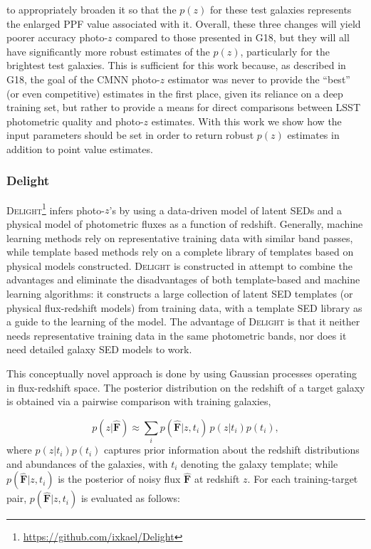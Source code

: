 \documentclass[usenatbib]{mn2e}
\begin{document}
\noindent to appropriately broaden it so that the $p(z)$ for these test galaxies represents the enlarged PPF value associated with it. Overall, these three changes will yield poorer accuracy photo-$z$ compared to those presented in G18, but they will all have significantly more robust estimates of the $p(z)$, particularly for the brightest test galaxies. This is sufficient for this work because, as described in G18, the goal of the \textsc{CMNN} photo-$z$ estimator was never to provide the ``best'' (or even competitive) estimates in the first place, given its reliance on a deep training set, but rather to provide a means for direct comparisons between LSST photometric quality and photo-$z$ estimates. With this work we show how the input parameters should be set in order to return robust $p(z)$ estimates in addition to point value estimates. 


\subsubsection{Delight}
\label{sec:delight}

\textsc{Delight}\footnote{\url{https://github.com/ixkael/Delight}} \citep{Leistedt:17} infers photo-$z$'s by using a data-driven model of latent SEDs and a physical model of photometric fluxes as a function of redshift. Generally, machine learning methods rely on representative training data with similar band passes, while template based methods rely on a complete library of templates based on physical models constructed. \textsc{Delight} is constructed in attempt to combine the advantages and eliminate the disadvantages of both template-based and machine learning algorithms: it constructs a large collection of latent SED templates (or physical flux-redshift models) from training data, with a template SED library as a guide to the learning of the model. The advantage of \textsc{Delight} is that it neither needs representative training data in the same photometric bands, nor does it need detailed galaxy SED models to work.

This conceptually novel approach is done by using Gaussian processes operating in flux-redshift space. The posterior distribution on the redshift of a target galaxy is obtained via a pairwise comparison with training galaxies,

\begin{equation}
p(z|\mathbf{\hat{F}}) \approx \sum_i p(\mathbf{\hat{F}}|z,t_i)\, p(z|t_i)p(t_i),
\end{equation}
\noindent where $p(z|t_i)p(t_i)$ captures prior information about the redshift distributions and abundances of the galaxies, with $t_i$ denoting the galaxy template; while $p(\mathbf{\hat{F}}|z,t_i)$ is the posterior of noisy flux $\mathbf{\hat{F}}$ at redshift $z$. For each training-target pair, $p(\mathbf{\hat{F}}|z,t_i)$ is evaluated as follows:
\end{document}
